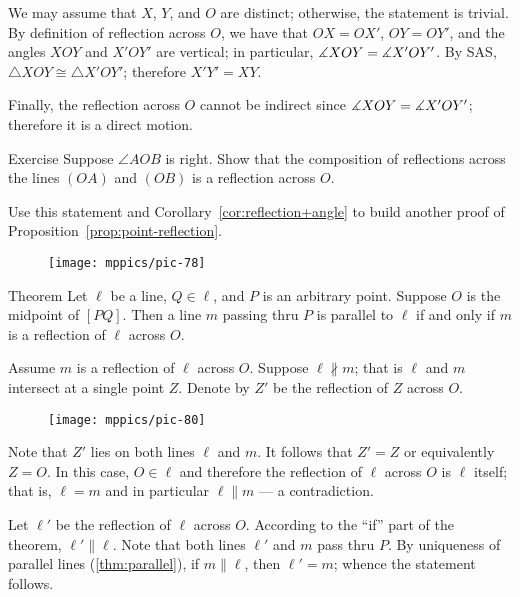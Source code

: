 We may assume that $X$, $Y$, and $O$ are distinct; otherwise, the statement is trivial.
By definition of reflection across $O$, we have that $OX=OX'$, $OY=OY'$, and the angles $XOY$ and $X'OY'$ are vertical;
in particular, $\measuredangle XOY\z=\measuredangle X'OY'$.
By SAS, $\triangle XOY\cong\triangle X'OY'$;
therefore $X'Y'=XY$.

Finally, the reflection across $O$ cannot be indirect since $\measuredangle XOY\z=\measuredangle X'OY'$;
therefore it is a direct motion.
\qeds

\begin{thm}{Exercise}
Suppose $\angle AOB$ is right.
Show that the composition of reflections across the lines $(OA)$ and $(OB)$ is a reflection across $O$.

Use this statement and Corollary~\ref{cor:reflection+angle} to build another proof of Proposition~\ref{prop:point-reflection}.
\end{thm}

{

\begin{wrapfigure}{r}{23mm}
\vskip-6mm
\centering
\texttt{[image: mppics/pic-78]}
\end{wrapfigure}


\begin{thm}{Theorem}\label{thm:parallel-point-reflection}
Let $\ell$ be a line, $Q\in \ell$, and $P$ is an arbitrary point.
Suppose $O$ is the midpoint of $[PQ]$.
Then a line $m$ passing thru $P$ is parallel to $\ell$ if and only if $m$ is a reflection of $\ell$ across $O$.
\end{thm}

}

Assume $m$ is a reflection of $\ell$ across $O$.
Suppose $\ell\nparallel m$; that is $\ell$ and $m$ intersect at a single point $Z$.
Denote by $Z'$ be the reflection of $Z$ across $O$.

\begin{figure}[!ht]
\centering
\texttt{[image: mppics/pic-80]}
\end{figure}

Note that $Z'$ lies on both lines $\ell$ and $m$.
It follows that $Z'=Z$ or equivalently $Z=O$.
In this case, $O\in \ell$ and therefore the reflection of $\ell$ across $O$ is $\ell$ itself;
that is, $\ell=m$ and in particular $\ell\parallel m$ --- a contradiction. 

Let $\ell'$ be the reflection of $\ell$ across $O$.
According to the ``if'' part of the theorem, $\ell'\parallel \ell$.
Note that both lines $\ell'$ and $m$ pass thru $P$.
By uniqueness of parallel lines (\ref{thm:parallel}), if $m\parallel \ell$, then $\ell'=m$; whence the statement follows.
\qeds


